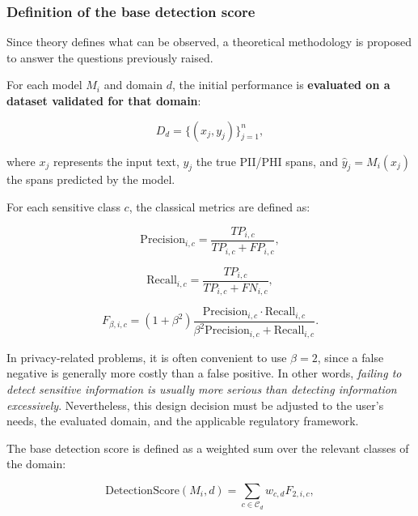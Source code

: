 \documentclass[11pt,a4paper]{article}
\begin{document}
\subsubsection{Definition of the base detection score}

Since theory defines what can be observed, a theoretical methodology is proposed to answer the questions previously raised.

For each model $M_i$ and domain $d$, the initial performance is \textbf{evaluated on a dataset validated for that domain}:

\begin{equation}
    D_d = \{(x_j,y_j)\}_{j=1}^{n},
\end{equation}

where $x_j$ represents the input text, $y_j$ the true PII/PHI spans, and $\hat{y}_j=M_i(x_j)$ the spans predicted by the model.

For each sensitive class $c$, the classical metrics are defined as:

\begin{equation}
    \mathrm{Precision}_{i,c} =
    \frac{TP_{i,c}}{TP_{i,c}+FP_{i,c}},
\end{equation}

\begin{equation}
    \mathrm{Recall}_{i,c} =
    \frac{TP_{i,c}}{TP_{i,c}+FN_{i,c}},
\end{equation}

\begin{equation}
    F_{\beta,i,c} =
    (1+\beta^2)
    \frac{\mathrm{Precision}_{i,c}\cdot \mathrm{Recall}_{i,c}}
    {\beta^2\mathrm{Precision}_{i,c}+\mathrm{Recall}_{i,c}}.
\end{equation}

In privacy-related problems, it is often convenient to use $\beta=2$, since a false negative is generally more costly than a false positive. In other words, \textit{failing to detect sensitive information is usually more serious than detecting information excessively}. Nevertheless, this design decision must be adjusted to the user’s needs, the evaluated domain, and the applicable regulatory framework.

The base detection score is defined as a weighted sum over the relevant classes of the domain:

\begin{equation}
    \mathrm{DetectionScore}(M_i,d)=
    \sum_{c\in\mathcal{C}_d} w_{c,d}F_{2,i,c},
\end{equation}
\end{document}
